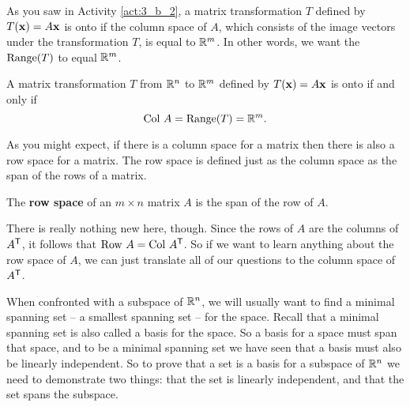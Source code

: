 As you saw in Activity \ref{act:3_b_2}, a matrix transformation $T$ defined by $T(\mathbf{x})=A\mathbf{x}$ is onto if the column space of $A$, which consists of the image vectors under the transformation $T$, is equal to $\mathbb{R}^m$. In other words, we want the $\text{Range}(T)$ to equal $\mathbb{R}^m$.

\begin{theorem} \label{thm:3_b_onto_range} A matrix transformation $T$ from $\mathbb{R}^n$ to $\mathbb{R}^m$ defined by $T(\mathbf{x}) = A\mathbf{x}$ is onto if and only if 
\[\text{Col } A = \text{Range}(T) = \mathbb{R}^m.\] 
\end{theorem}



\label{sec:row_space}

As you might expect, if there is a column space for a matrix then there is also a row space for a matrix. The row space is defined just as the column space as the span of the rows of a matrix. 

\begin{definition} The \textbf{row space} of an $m \times n$ matrix $A$ is the span of the row of $A$.
\end{definition}

There is really nothing new here, though. Since the rows of $A$ are the columns of $A^{\mathsf{T}}$, it follows that $\text{Row } A = \text{Col } A^{\mathsf{T}}$. So if we want to learn anything about the row space of $A$, we can just translate all of our questions to the column space of $A^{\mathsf{T}} $. 

\label{sec:null_col_base}

When confronted with a subspace of $\mathbb{R}^n$, we will usually want to find a minimal spanning set -- a smallest spanning set -- for the space. Recall that a minimal spanning set is also called a basis for the space. So a basis for a space must span that space, and to be a minimal spanning set we have seen that a basis must also be linearly independent.  So to prove that a set is a basis for a subspace of $\mathbb{R}^n$ we need to demonstrate two things: that the set is linearly independent, and that the set spans the subspace. 



